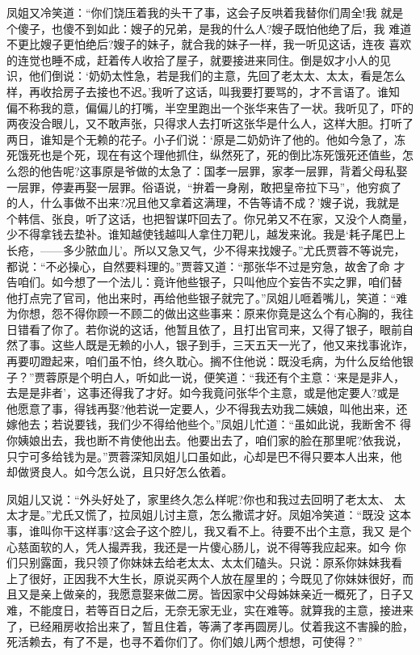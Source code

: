 凤姐又冷笑道：“你们饶压着我的头干了事，这会子反哄着我替你们周全!我
就是个傻子，也傻不到如此：嫂子的兄弟，是我的什么人?嫂子既怕他绝了后，我
难道不更比嫂子更怕绝后?嫂子的妹子，就合我的妹子一样，我一听见这话，连夜
喜欢的连觉也睡不成，赶着传人收拾了屋子，就要接进来同住。倒是奴才小人的见
识，他们倒说：‘奶奶太性急，若是我们的主意，先回了老太太、太太，看是怎么
样，再收拾房子去接也不迟。’我听了这话，叫我要打要骂的，才不言语了。谁知
偏不称我的意，偏偏儿的打嘴，半空里跑出一个张华来告了一状。我听见了，吓的
两夜没合眼儿，又不敢声张，只得求人去打听这张华是什么人，这样大胆。打听了
两日，谁知是个无赖的花子。小子们说：‘原是二奶奶许了他的。他如今急了，冻
死饿死也是个死，现在有这个理他抓住，纵然死了，死的倒比冻死饿死还值些，怎
么怨的他告呢?这事原是爷做的太急了：国孝一层罪，家孝一层罪，背着父母私娶
一层罪，停妻再娶一层罪。俗语说，“拚着一身剐，敢把皇帝拉下马”，他穷疯了
的人，什么事做不出来?况且他又拿着这满理，不告等请不成？’嫂子说，我就是
个韩信、张良，听了这话，也把智谋吓回去了。你兄弟又不在家，又没个人商量，
少不得拿钱去垫补。谁知越使钱越叫人拿住刀靶儿，越发来讹。我是‘耗子尾巴上
长疮，——多少脓血儿’。所以又急又气，少不得来找嫂子。”尤氏贾蓉不等说完，
都说：“不必操心，自然要料理的。”贾蓉又道：“那张华不过是穷急，故舍了命
才告咱们。如今想了一个法儿：竟许他些银子，只叫他应个妄告不实之罪，咱们替
他打点完了官司，他出来时，再给他些银子就完了。”凤姐儿咂着嘴儿，笑道：“难
为你想，怨不得你顾一不顾二的做出这些事来：原来你竟是这么个有心胸的，我往
日错看了你了。若你说的这话，他暂且依了，且打出官司来，又得了银子，眼前自
然了事。这些人既是无赖的小人，银子到手，三天五天一光了，他又来找事讹诈，
再要叨蹬起来，咱们虽不怕，终久耽心。搁不住他说：既没毛病，为什么反给他银
子？”贾蓉原是个明白人，听如此一说，便笑道：“我还有个主意：‘来是是非人，
去是是非者’，这事还得我了才好。如今我竟问张华个主意，或是他定要人?或是
他愿意了事，得钱再娶?他若说一定要人，少不得我去劝我二姨娘，叫他出来，还
嫁他去；若说要钱，我们少不得给他些个。”凤姐儿忙道：“虽如此说，我断舍不
得你姨娘出去，我也断不肯使他出去。他要出去了，咱们家的脸在那里呢?依我说，
只宁可多给钱为是。”贾蓉深知凤姐儿口虽如此，心却是巴不得只要本人出来，他
却做贤良人。如今怎么说，且只好怎么依着。

凤姐儿又说：“外头好处了，家里终久怎么样呢?你也和我过去回明了老太太、
太太才是。”尤氏又慌了，拉凤姐儿讨主意，怎么撒谎才好。凤姐冷笑道：“既没
这本事，谁叫你干这样事?这会子这个腔儿，我又看不上。待要不出个主意，我又
是个心慈面软的人，凭人撮弄我，我还是一片傻心肠儿，说不得等我应起来。如今
你们只别露面，我只领了你妹妹去给老太太、太太们磕头。只说：原系你妹妹我看
上了很好，正因我不大生长，原说买两个人放在屋里的；今既见了你妹妹很好，而
且又是亲上做亲的，我愿意娶来做二房。皆因家中父母姊妹亲近一概死了，日子又
难，不能度日，若等百日之后，无奈无家无业，实在难等。就算我的主意，接进来
了，已经厢房收拾出来了，暂且住着，等满了孝再圆房儿。仗着我这不害臊的脸，
死活赖去，有了不是，也寻不着你们了。你们娘儿两个想想，可使得？”

